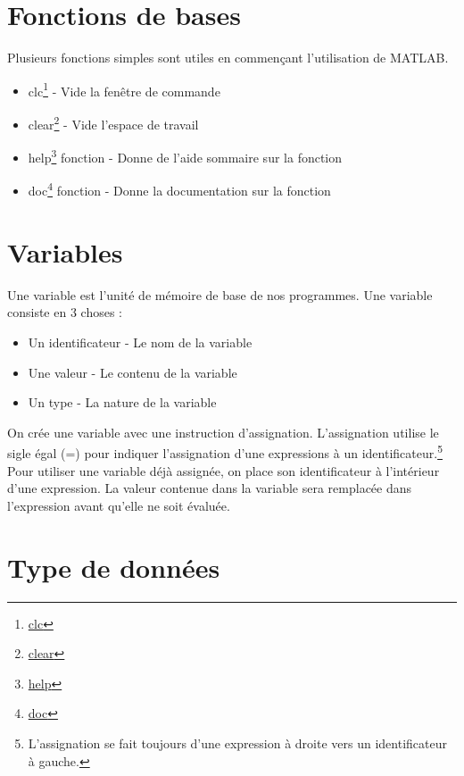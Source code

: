 \documentclass[]{tufte-handout}
\providecommand{\tightlist}{%
  \setlength{\itemsep}{0pt}\setlength{\parskip}{0pt}}
\begin{document}
\hypertarget{fonctions-de-bases}{%
\section{Fonctions de bases}\label{fonctions-de-bases}}

Plusieurs fonctions simples sont utiles en commençant l'utilisation de
MATLAB.

\begin{itemize}
\tightlist
\item
  clc\footnote{\href{https://www.mathworks.com/help/matlab/ref/clc.html}{clc}}
  - Vide la fenêtre de commande
\item
  clear\footnote{\href{https://www.mathworks.com/help/matlab/ref/clear.html}{clear}}
  - Vide l'espace de travail
\item
  help\footnote{\href{https://www.mathworks.com/help/matlab/ref/help.html}{help}}
  fonction - Donne de l'aide sommaire sur la fonction
\item
  doc\footnote{\href{https://www.mathworks.com/help/matlab/ref/doc.html}{doc}}
  fonction - Donne la documentation sur la fonction
\end{itemize}

\hypertarget{variables}{%
\section{Variables}\label{variables}}

Une variable est l'unité de mémoire de base de nos programmes. Une
variable consiste en 3 choses :

\begin{itemize}
\tightlist
\item
  Un identificateur - Le nom de la variable
\item
  Une valeur - Le contenu de la variable
\item
  Un type - La nature de la variable
\end{itemize}

On crée une variable avec une instruction d'assignation. L'assignation
utilise le sigle égal (=) pour indiquer l'assignation d'une expressions
à un identificateur.\footnote{L'assignation se fait toujours d'une
  expression à droite vers un identificateur à gauche.} Pour utiliser
une variable déjà assignée, on place son identificateur à l'intérieur
d'une expression. La valeur contenue dans la variable sera remplacée
dans l'expression avant qu'elle ne soit évaluée.

\hypertarget{type-de-donnuxe9es}{%
\section{Type de données}\label{type-de-donnuxe9es}}
\end{document}
